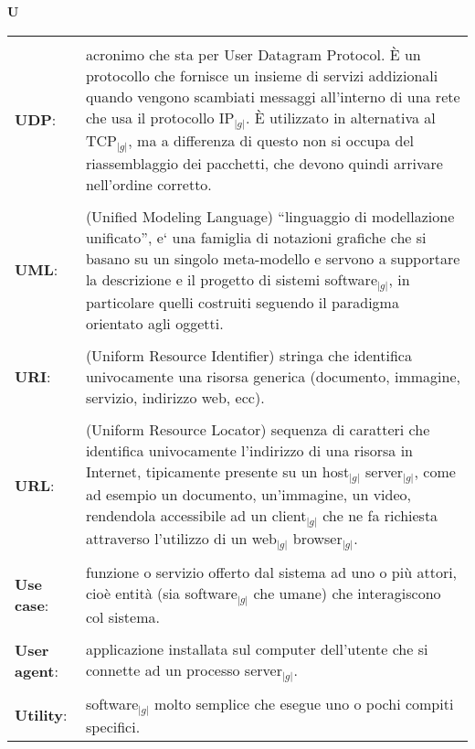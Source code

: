 \hfill\Huge{\textbf{U}}\\
\normalsize
\label{tabVers}
	\begin{longtable}{p{} p{}} 
	    \toprule
	    \\
	    \textbf{UDP}:	       &	acronimo che sta per User Datagram Protocol. \`E un protocollo che fornisce un insieme di servizi addizionali quando vengono scambiati messaggi 
						all’interno di una rete che usa il protocollo IP$_{|g|}$. \`E utilizzato in alternativa al TCP$_{|g|}$, ma a differenza di questo non si occupa del riassemblaggio dei pacchetti, 
						che devono quindi arrivare nell’ordine corretto.\\
	    \\
	    \textbf{UML}: 		&	(Unified Modeling Language) “linguaggio di modellazione unificato”, e` una famiglia di notazioni grafiche che si basano su un singolo meta-modello e servono a supportare la descrizione e il progetto di sistemi software$_{|g|}$, in particolare 
						quelli costruiti seguendo il paradigma orientato agli oggetti.\\
	    \\
	    \textbf{URI}:		&	(Uniform Resource Identifier) stringa che identifica univocamente una risorsa generica (documento, immagine, servizio, indirizzo web, ecc).\\
	    \\
	    \textbf{URL}: 		&	(Uniform Resource Locator) sequenza di caratteri che identifica univocamente l'indirizzo di una risorsa in Internet, tipicamente presente su un host$_{|g|}$ server$_{|g|}$, come ad esempio un documento, un'immagine, un video, rendendola accessibile ad 
						un client$_{|g|}$ che ne fa richiesta attraverso l'utilizzo di un web$_{|g|}$ browser$_{|g|}$.\\
	    \\
	    \textbf{Use case}:		&	funzione o servizio offerto dal sistema ad uno o più attori, cioè entità (sia software$_{|g|}$ che umane) che interagiscono col sistema.\\
	    \\
	    \textbf{User agent}:	& 	applicazione installata sul computer dell'utente che si connette ad un processo server$_{|g|}$.\\
	    \\
	    \textbf{Utility}:		&	software$_{|g|}$ molto semplice che esegue uno o pochi compiti specifici.\\
	\end{longtable}
\newpage


